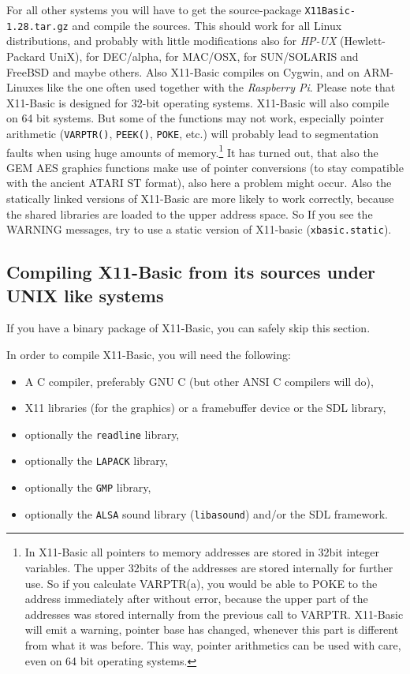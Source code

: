 For all other systems you will have to get the source-package 
\verb|X11Basic-1.28.tar.gz| and compile the sources. This should work for  all
Linux distributions, and probably with little modifications also for {\it
HP-UX} (Hewlett-Packard UniX), for DEC/alpha, for MAC/OSX, for SUN/SOLARIS and
FreeBSD and maybe others.  Also X11-Basic compiles on Cygwin, and on
ARM-Linuxes like the one often used together with the {\it Raspberry Pi}. 
Please note that X11-Basic is designed for 32-bit operating systems. 
X11-Basic will also compile on 64 bit systems. But some of the
functions may not work, especially pointer arithmetic (\verb|VARPTR()|, 
\verb|PEEK()|, \verb|POKE|, etc.)
will probably lead to segmentation faults when using huge amounts of 
memory.\footnote{In X11-Basic all pointers to memory addresses are stored in 
32bit integer variables. The upper 32bits of the addresses are stored internally
for further use. So if you calculate VARPTR(a), you would be able to 
POKE to the address immediately after without error, because the upper part of 
the addresses was stored internally from the previous call to VARPTR. 
X11-Basic will emit a warning, 
pointer base has changed, whenever this part is different from what it 
was before. This way, pointer arithmetics can be used with care, even on 64 bit 
operating systems.} It has turned out, that also the GEM AES graphics functions 
make use of pointer conversions (to stay compatible with the ancient ATARI ST format), 
also here a problem might occur. Also the statically linked versions of X11-Basic are
more likely to work correctly, because the shared libraries are loaded to the upper
address space. So If you see the WARNING messages, try to use a static version of 
X11-basic (\verb|xbasic.static|). 

\subsection*{Compiling X11-Basic from its sources under UNIX like systems}

If you have a binary package of X11-Basic, you can safely skip this section.

In order to compile X11-Basic, you will need the following:

\begin{itemize}
 \item A C compiler, preferably GNU C (but other ANSI C compilers will do), 
 \item X11 libraries  (for the graphics) or a framebuffer device or the SDL library,
 \item optionally the \verb|readline| library, 
 \item optionally the \verb|LAPACK| library,
 \item optionally the \verb|GMP| library,  
 \item optionally the \verb|ALSA| sound library (\verb|libasound|) and/or the SDL framework.
\end{itemize}  

